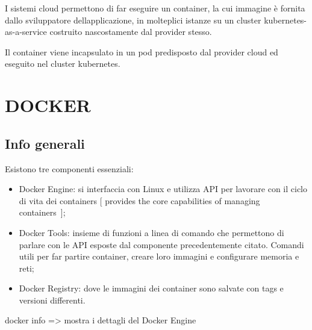 \documentclass[
]{article}
\providecommand{\tightlist}{%
  \setlength{\itemsep}{0pt}\setlength{\parskip}{0pt}}
\begin{document}
{I sistemi cloud permettono di far eseguire un container, la cui
immagine è fornita dallo sviluppatore dell\textquotesingle applicazione,
in molteplici istanze su un cluster kubernetes-as-a-service costruito
nascostamente dal provider stesso. }

{Il container viene incapsulato in un pod predisposto dal provider cloud
ed eseguito nel cluster kubernetes.}

{}

{}

\section{\texorpdfstring{{DOCKER}}{DOCKER}}\label{h.3ppurwji5q6q}

{}

\subsection{\texorpdfstring{{Info
generali}}{Info generali}}\label{h.v2hul8flyw5j}

{Esistono tre componenti essenziali:}

{}

\begin{itemize}
\tightlist
\item
  {Docker Engine}{: si interfaccia con Linux e utilizza API per lavorare
  con il ciclo di vita dei containers {[} }{provides the core
  capabilities of managing containers}{~{]};}
\end{itemize}

{}

\begin{itemize}
\tightlist
\item
  {Docker Tools}{: insieme di funzioni a linea di comando che permettono
  di parlare con le API esposte dal componente precedentemente citato.
  Comandi utili per far partire container, creare loro immagini e
  configurare memoria e reti;}
\end{itemize}

{}

\begin{itemize}
\tightlist
\item
  {Docker Registry}{: dove le immagini dei container sono salvate con
  tags e versioni differenti.}
\end{itemize}

{}

{docker info =\textgreater{} mostra i dettagli del Docker Engine}
\end{document}
